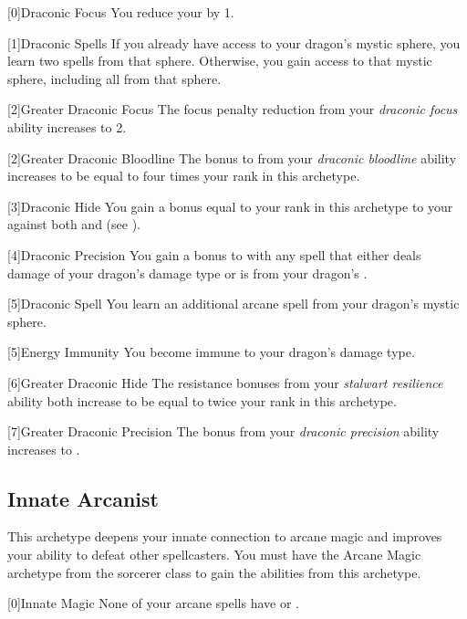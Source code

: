         [0]{Draconic Focus} You reduce your  by 1.

        [1]{Draconic Spells} If you already have access to your dragon's mystic sphere, you learn two spells from that sphere.
        Otherwise, you gain access to that mystic sphere, including all  from that sphere.

        [2]{Greater Draconic Focus} The focus penalty reduction from your \textit{draconic focus} ability increases to 2.

        [2]{Greater Draconic Bloodline} The bonus to  from your \textit{draconic bloodline} ability increases to be equal to four times your rank in this archetype.

        [3]{Draconic Hide} You gain a bonus equal to your rank in this archetype to your  against both  and  (see ).

        [4]{Draconic Precision} You gain a  bonus to  with any spell that either deals damage of your dragon's damage type or is from your dragon's .

        [5]{Draconic Spell} You learn an additional arcane spell from your dragon's mystic sphere.

        [5]{Energy Immunity} You become immune to your dragon's damage type.

        [6]{Greater Draconic Hide} The resistance bonuses from your \textit{stalwart resilience} ability both increase to be equal to twice your rank in this archetype.

        [7]{Greater Draconic Precision} The bonus from your \textit{draconic precision} ability increases to .

    \newpage
    \subsection{Innate Arcanist}
        This archetype deepens your innate connection to arcane magic and improves your ability to defeat other spellcasters.
        You must have the Arcane Magic archetype from the sorcerer class to gain the abilities from this archetype.

        [0]{Innate Magic} None of your arcane spells have  or .

